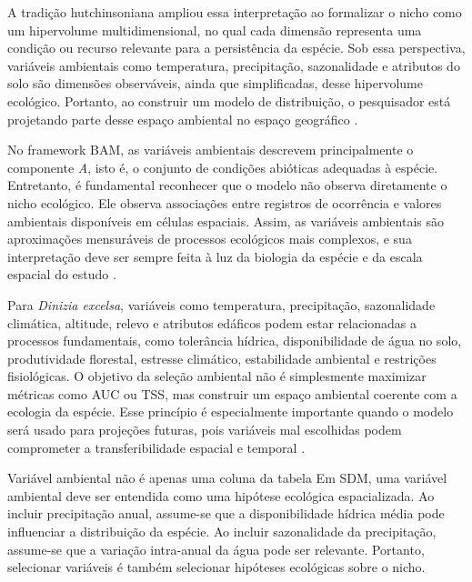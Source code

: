 A tradição hutchinsoniana ampliou essa interpretação ao formalizar o nicho como um hipervolume multidimensional, no qual cada dimensão representa uma condição ou recurso relevante para a persistência da espécie. Sob essa perspectiva, variáveis ambientais como temperatura, precipitação, sazonalidade e atributos do solo são dimensões observáveis, ainda que simplificadas, desse hipervolume ecológico. Portanto, ao construir um modelo de distribuição, o pesquisador está projetando parte desse espaço ambiental no espaço geográfico \parencite{hutchinson1957concluding,peterson2011ecological}.

No framework BAM, as variáveis ambientais descrevem principalmente o componente \textit{A}, isto é, o conjunto de condições abióticas adequadas à espécie. Entretanto, é fundamental reconhecer que o modelo não observa diretamente o nicho ecológico. Ele observa associações entre registros de ocorrência e valores ambientais disponíveis em células espaciais. Assim, as variáveis ambientais são aproximações mensuráveis de processos ecológicos mais complexos, e sua interpretação deve ser sempre feita à luz da biologia da espécie e da escala espacial do estudo \parencite{soberon2007grinnellian,guisan2017habitat}.

Para \textit{Dinizia excelsa}, variáveis como temperatura, precipitação, sazonalidade climática, altitude, relevo e atributos edáficos podem estar relacionadas a processos fundamentais, como tolerância hídrica, disponibilidade de água no solo, produtividade florestal, estresse climático, estabilidade ambiental e restrições fisiológicas. O objetivo da seleção ambiental não é simplesmente maximizar métricas como AUC ou TSS, mas construir um espaço ambiental coerente com a ecologia da espécie. Esse princípio é especialmente importante quando o modelo será usado para projeções futuras, pois variáveis mal escolhidas podem comprometer a transferibilidade espacial e temporal \parencite{elith2009species,zurell2020standard}.

\begin{caixaconceitual}{Variável ambiental não é apenas uma coluna da tabela}
	Em SDM, uma variável ambiental deve ser entendida como uma hipótese ecológica espacializada. Ao incluir precipitação anual, assume-se que a disponibilidade hídrica média pode influenciar a distribuição da espécie. Ao incluir sazonalidade da precipitação, assume-se que a variação intra-anual da água pode ser relevante. Portanto, selecionar variáveis é também selecionar hipóteses ecológicas sobre o nicho.
\end{caixaconceitual}

